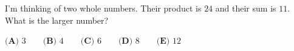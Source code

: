 I'm thinking of two whole numbers. Their product is $24$ and their sum is $11$. What is the larger number?

$\textbf{(A) } 3\qquad\textbf{(B) } 4\qquad\textbf{(C) } 6\qquad\textbf{(D) } 8\qquad\textbf{(E) } 12$
